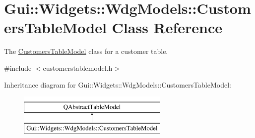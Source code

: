 \hypertarget{classGui_1_1Widgets_1_1WdgModels_1_1CustomersTableModel}{}\section{Gui\+:\+:Widgets\+:\+:Wdg\+Models\+:\+:Customers\+Table\+Model Class Reference}
\label{classGui_1_1Widgets_1_1WdgModels_1_1CustomersTableModel}


The \hyperlink{classGui_1_1Widgets_1_1WdgModels_1_1CustomersTableModel}{Customers\+Table\+Model} class for a customer table.  




{\ttfamily \#include $<$customerstablemodel.\+h$>$}

Inheritance diagram for Gui\+:\+:Widgets\+:\+:Wdg\+Models\+:\+:Customers\+Table\+Model\+:\begin{figure}[H]
\begin{center}
\leavevmode
\includegraphics[height=2.000000cm]{d7/d12/classGui_1_1Widgets_1_1WdgModels_1_1CustomersTableModel}
\end{center}
\end{figure}
